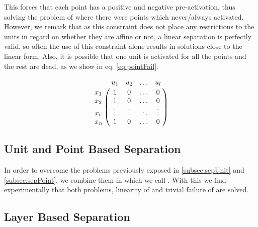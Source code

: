 This forces that each point has a positive and negative pre-activation, thus solving the problem of \SepUnit where there were points which never/always activated. However, we remark that as this constraint does not place any restrictions to the units in regard on whether they are affine or not, a linear separation is perfectly valid, so often the use of this constraint alone results in solutions close to the linear form. Also, it is possible that one unit is activated for all the points and the rest are dead, as we show in eq. \ref{eq:pointFail}.

\begin{equation}\label{eq:pointFail}
    \bordermatrix{ &u_1& u_2&\ldots &u_l\cr
                x_1& 1 &  0  & \ldots & 0\cr
                x_2& 1  &  0 & \ldots & 0\cr
                x_i& \vdots & \vdots & \ddots & \vdots\cr
                x_n& 1  &   0       &\ldots & 0} \\[15pt]
\end{equation}

\subsection{Unit and Point Based Separation \SepUnitPoint}\label{subsec:sepUnitPoint}

In order to overcome the problems previously exposed in \ref{subsec:sepUnit} and \ref{subsec:sepPoint}, we combine them in which we call \SepUnitPoint. With this we find experimentally that both problems, linearity of \SepPoint and trivial failure of \SepUnit are solved.

\subsection{Layer Based Separation \SepLayer}\label{subsec:sepLayer}

